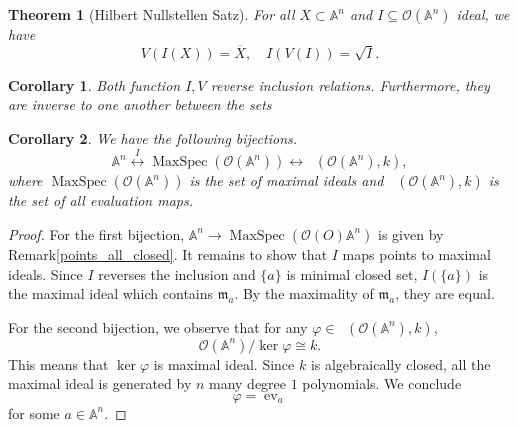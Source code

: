 \documentclass[10pt]{article}
\newtheorem{theorem}{Theorem} [section]
\newtheorem{corollary}{Corollary} [section]
\numberwithin{equation}{theorem}
\DeclareMathOperator{\ev}{ev}
\DeclareMathOperator{\Homk}{Hom_{k-alg}}
\DeclareMathOperator{\Ker}{ker}
\DeclareMathOperator{\MaxSpec}{MaxSpec}
\newcommand{\Ouv}[0]{\mathcal{O}}
\newcommand{\A}[0]{\mathbb{A}}
\begin{document}
\begin{theorem}[Hilbert Nullstellen Satz]
For all $X\subset \A^n$ and $I\subseteq\mathcal{O}(\A^n)$ ideal, we have
\begin{equation*}
V(I(X)) = \overline{X},\quad I(V(I))=\sqrt{I}.
\end{equation*}
\end{theorem}

\begin{corollary}
Both function $I,V$ reverse inclusion relations. Furthermore, they are inverse to one another between the sets
\begin{center}
\end{center}
\end{corollary}

\begin{corollary}
We have the following bijections.
\begin{equation*}
\A^n\stackrel{I}{\leftrightarrow}\MaxSpec(\mathcal{O}(\A^n))\leftrightarrow\Homk(\mathcal{O}(\A^n),k),
\end{equation*}
where $\MaxSpec(\Ouv(\A^n))$ is the set of maximal ideals and $\Homk(\mathcal{O}(\A^n),k)$ is the set of all evaluation maps.
\end{corollary}
\begin{proof}
For the first bijection, $\A^n\to \MaxSpec(\Ouv(O)\A^n)$ is given by Remark\ref{points_all_closed}. It remains to show that $I$ maps points to maximal ideals. Since $I$ reverses the inclusion and $\{a\}$ is minimal closed set, $I(\{a\})$ is the maximal ideal which contains $\mathfrak{m}_a$. By the maximality of $\mathfrak{m}_a$, they are equal.
\par For the second bijection, we observe that for any $\varphi\in\Homk(\mathcal{O}(\A^n),k)$,
\begin{equation*}
\mathcal{O}(\A^n)/\Ker\varphi \cong k.
\end{equation*}
This means that $\Ker\varphi$ is maximal ideal. Since $k$ is algebraically closed, all the maximal ideal is generated by $n$ many degree $1$ polynomials. We conclude 
\begin{equation*}
\varphi = \ev_a
\end{equation*}
for some $a\in\A^n$.
\end{proof}
\end{document}

